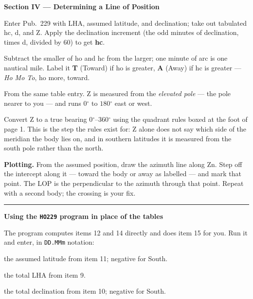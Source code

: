 \documentclass[10pt]{article}
\newcommand{\dg}{\ensuremath{^\circ}}
\begin{document}
\textbf{Section IV --- Determining a Line of Position}
\begin{description}[leftmargin=2.4em,style=nextline,itemsep=0.1ex,topsep=0.2ex,parsep=0pt]
\item[12. Computed altitude.] Enter Pub.\ 229 with LHA, assumed latitude, and
  declination; take out tabulated hc, d, and Z. Apply the declination increment
  (the odd minutes of declination, times d, divided by 60) to get \textbf{hc}.
\item[13. Altitude intercept.] Subtract the smaller of ho and hc from the larger;
  one minute of arc is one nautical mile. Label it \textbf{T} (Toward) if ho is
  greater, \textbf{A} (Away) if hc is greater --- \emph{Ho Mo To}, ho more, toward.
\item[14. Azimuth angle Z.] From the same table entry. Z is measured from the
  \emph{elevated pole} --- the pole nearer to you --- and runs $0\dg$ to $180\dg$
  east or west.
\item[15. Azimuth Zn.] Convert Z to a true bearing $0\dg$--$360\dg$ using the
  quadrant rules boxed at the foot of page 1. This is the step the rules exist for:
  Z alone does not say which side of the meridian the body lies on, and in southern
  latitudes it is measured from the south pole rather than the north.
\end{description}

\textbf{Plotting.} From the assumed position, draw the azimuth line along Zn. Step
off the intercept along it --- toward the body or away as labelled --- and mark that
point. The LOP is the perpendicular to the azimuth through that point. Repeat with a
second body; the crossing is your fix.

\vspace{0.8ex}
\hrule
\vspace{0.6ex}

\textbf{Using the \texttt{HO229} program in place of the tables}

\vspace{0.4ex}
The program computes items 12 and 14 directly and does item 15 for you. Run it and
enter, in \texttt{DD.MMm} notation:

\begin{description}[leftmargin=2.4em,style=nextline,itemsep=0pt,topsep=0.2ex,parsep=0pt]
\item[\texttt{LAT N+ S-}] the assumed latitude from item 11; negative for South.
\item[\texttt{LHA DDD.MMm}] the total LHA from item 9.
\item[\texttt{DEC N+ S-}] the total declination from item 10; negative for South.
\end{description}
\end{document}
